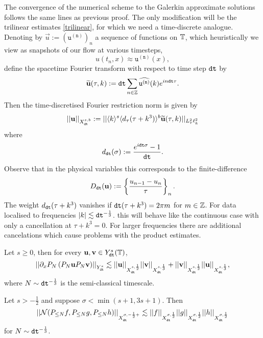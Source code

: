 The convergence of the numerical scheme to the Galerkin approximate solutions follows the same lines as previous proof. The only modification will be the trilinear estimates \eqref{trilinear}, for which we need a time-discrete analogue. Denoting by $\vec u := (\mathtt{u^{(n)}})_n$ a sequence of functions on $\mathbb T$, which heuristically we view as snapshots of our flow at various timesteps, 
    \[
        u(t_n, x) \approx \mathtt{u^{(n)}} (x), 
    \]
define the spacetime Fourier transform with respect to time step $\mathtt{dt}$ by 
    \[
        \widetilde{\mathbf u} (\tau, k) 
            := \mathtt{dt} \sum_{n \in \mathbb Z} \widehat{\mathtt{u^{(n)}}} (k) e^{i n \mathtt{dt} \tau}.  
    \]
Then the time-discretised Fourier restriction norm is given by 
    \[
        ||\mathbf u||_{X^{s, b}_{\mathtt{dt}}} 
            := || \langle k \rangle^s \langle d_\tau ( \tau + k^3) \rangle^b \widetilde{\mathbf u} (\tau, k)  ||_{L^2_\tau \ell^2_k}
    \]
where 
    \[
        d_{\mathtt{dt}} (\sigma) 
            := \frac{e^{i \mathtt{dt} \sigma} - 1}{\mathtt{dt}}. 
    \]
Observe that in the physical variables this corresponds to the finite-difference 
    \[
        D_{\mathtt{dt}} (\mathbf u) 
            := \left\{ \frac{u_{n - 1} - u_n}{\tau} \right\}_n. 
    \]
The weight $d_{\mathtt{dt}} (\tau + k^3)$ vanishes if $\mathtt{dt}(\tau + k^3) = 2\pi m$ for $m \in \mathbb Z$. For data localised to frequencies $|k| \lesssim \mathtt{dt}^{-\frac13}$. this will behave like the continuous case with only a cancellation at $\tau + k^3 = 0$. For larger frequencies there are additional cancelations which cause problems with the product estimates. 

\begin{lemma}
    Let $s \geq 0$, then for every $\mathbf u, \mathbf v \in Y^s_{\mathtt{dt}} (\mathbb T)$, 
        \begin{equation}
            \left|\left|\partial_x P_{N} \left(P_{N} \mathbf u P_{N} \mathbf v\right) \right|\right|_{Y^s_{\mathtt{dt}}} 
                \lesssim ||\mathbf u||_{X^{s, \frac12}_{\mathtt{dt}}} || \mathbf v||_{X^{s, \frac13}_{\mathtt{dt}}} +  ||\mathbf v||_{X^{s, \frac12}_{\mathtt{dt}}} || \mathbf u||_{X^{s, \frac13}_{\mathtt{dt}}},
        \end{equation}
    where $N \sim \mathtt{dt}^{-\frac13}$ is the semi-classical timescale. 
\end{lemma}

\begin{lemma}
    Let $s > -\tfrac12$ and suppose $\sigma < \min(s + 1, 3s + 1)$. Then 
        \begin{equation}
            ||\mathcal N (P_{\leq N} f, P_{\leq N} g, P_{\leq N} h)||_{X^{\sigma, -\frac12+}_{\mathtt{dt}}} 
                \lesssim ||f||_{X^{\sigma, \frac12}_{\mathtt{dt}}}  ||g||_{X^{\sigma, \frac12}_{\mathtt{dt}}}  ||h||_{X^{\sigma, \frac12}_{\mathtt{dt}}} 
        \end{equation}
    for $N \sim \mathtt{dt}^{-\frac13}$. 
\end{lemma}


